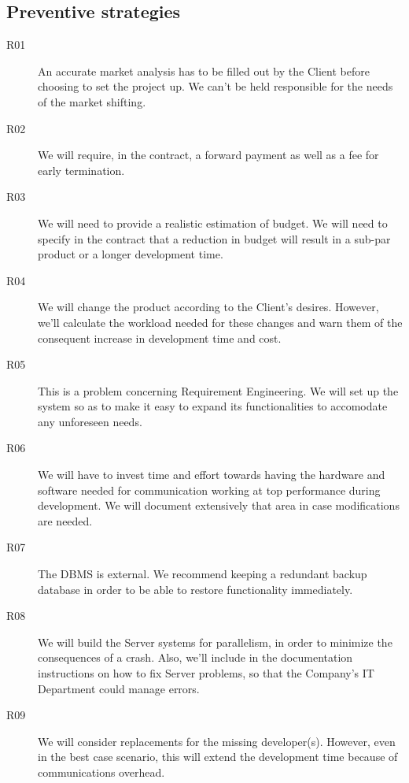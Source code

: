\subsection{Preventive strategies}
\begin{description}
	\item[R01] An accurate market analysis has to be filled out by the Client before choosing to set the project up. We can't be held responsible for the needs of the market shifting.
	\item[R02] We will require, in the contract, a forward payment as well as a fee for early termination.
	\item[R03] We will need to provide a realistic estimation of budget. We will need to specify in the contract that a reduction in budget will result in a sub-par product or a longer development time.
	\item[R04] We will change the product according to the Client's desires. However, we'll calculate the workload needed for these changes and warn them of the consequent increase in development time and cost.
	\item[R05] This is a problem concerning Requirement Engineering. We will set up the system so as to make it easy to expand its functionalities to accomodate any unforeseen needs.
	\item[R06] We will have to invest time and effort towards having the hardware and software needed for communication working at top performance during development. We will document extensively that area in case modifications are needed.
	\item[R07] The DBMS is external. We recommend keeping a redundant backup database in order to be able to restore functionality immediately.
	\item[R08] We will build the Server systems for parallelism, in order to minimize the consequences of a crash. Also, we'll include in the documentation instructions on how to fix Server problems, so that the Company's IT Department could manage errors.
	\item[R09] We will consider replacements for the missing developer(s). However, even in the best case scenario, this will extend the development time because of communications overhead.
\end{description}